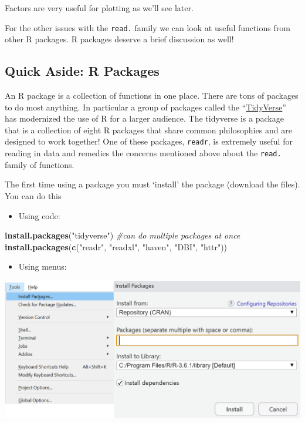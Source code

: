 \documentclass[
]{book}
\newenvironment{Shaded}{\begin{snugshade}}{\end{snugshade}}
\newcommand{\CommentTok}[1]{\textcolor[rgb]{0.56,0.35,0.01}{\textit{#1}}}
\newcommand{\KeywordTok}[1]{\textcolor[rgb]{0.13,0.29,0.53}{\textbf{#1}}}
\newcommand{\NormalTok}[1]{#1}
\newcommand{\StringTok}[1]{\textcolor[rgb]{0.31,0.60,0.02}{#1}}
\providecommand{\tightlist}{%
  \setlength{\itemsep}{0pt}\setlength{\parskip}{0pt}}
\theoremstyle{definition}
\theoremstyle{definition}
\theoremstyle{definition}
\theoremstyle{remark}
\begin{document}
Factors are very useful for plotting as we'll see later.

For the other issues with the \texttt{read.} family we can look at useful functions from other R packages. R packages deserve a brief discussion as well!

\hypertarget{quick-aside-r-packages}{%
\subsection{Quick Aside: R Packages}\label{quick-aside-r-packages}}

An R package is a collection of functions in one place. There are tons of packages to do most anything. In particular a group of packages called the ``\href{http://tidyverse.org/}{TidyVerse}'' has modernized the use of R for a larger audience. The tidyverse is a package that is a collection of eight R packages that share common philosophies and are designed to work together! One of these packages, \texttt{readr}, is extremely useful for reading in data and remedies the concerns mentioned above about the \texttt{read.} family of functions.

The first time using a package you must `install' the package (download the files). You can do this

\begin{itemize}
\tightlist
\item
  Using code:
\end{itemize}

\begin{Shaded}
\begin{Highlighting}[]
\KeywordTok{install.packages}\NormalTok{(}\StringTok{"tidyverse"}\NormalTok{)}
\CommentTok{#can do multiple packages at once}
\KeywordTok{install.packages}\NormalTok{(}\KeywordTok{c}\NormalTok{(}\StringTok{"readr"}\NormalTok{, }\StringTok{"readxl"}\NormalTok{, }\StringTok{"haven"}\NormalTok{, }\StringTok{"DBI"}\NormalTok{, }\StringTok{"httr"}\NormalTok{))}
\end{Highlighting}
\end{Shaded}

\begin{itemize}
\tightlist
\item
  Using menus:
\end{itemize}

\begin{center}\includegraphics[width=0.7\linewidth]{img/packages} \end{center}
\end{document}
